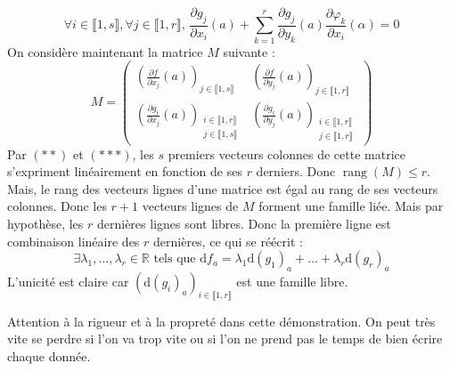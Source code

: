 \begin{demonstration}
		\[ \forall i \in \llbracket 1, s \rrbracket, \forall j \in \llbracket 1, r \rrbracket, \, \frac{\partial g_j}{\partial x_i}(a) + \sum_{k=1}^r \frac{\partial g_j}{\partial y_k}(a) \frac{\partial \varphi_k}{\partial x_i}(\alpha) = 0 \tag{$***$} \]
		On considère maintenant la matrice $M$ suivante :
		\[ M = \begin{pmatrix}
			\left( \frac{\partial f}{\partial x_j}(a) \right)_{j \in \llbracket 1, s \rrbracket} & \left( \frac{\partial f}{\partial y_j}(a) \right)_{j \in \llbracket 1, r \rrbracket} \\
			\left( \frac{\partial g_i}{\partial x_j}(a) \right)_{\substack{i \in \llbracket 1, r \rrbracket \\ j \in \llbracket 1, s \rrbracket}} & \left( \frac{\partial g_i}{\partial y_j}(a) \right)_{\substack{i \in \llbracket 1, r \rrbracket \\ j \in \llbracket 1, r \rrbracket}}
		\end{pmatrix} \]
		Par $(**)$ et $(***)$, les $s$ premiers vecteurs colonnes de cette matrice s'expriment linéairement en fonction de ses $r$ derniers. Donc $\operatorname{rang}(M) \leq r$. Mais, le rang des vecteurs lignes d'une matrice est égal au rang de ses vecteurs colonnes. Donc les $r+1$ vecteurs lignes de $M$ forment une famille liée. Mais par hypothèse, les $r$ dernières lignes sont libres. Donc la première ligne est combinaison linéaire des $r$ dernières, ce qui se réécrit :
		\[ \exists \lambda_1, \dots, \lambda_r \in \mathbb{R} \text{ tels que } \mathrm{d}f_a = \lambda_1 \mathrm{d}(g_1)_a + \dots + \lambda_r \mathrm{d}(g_r)_a \]
		L'unicité est claire car $(\mathrm{d}(g_i)_a)_{i \in \llbracket 1, r \rrbracket}$ est une famille libre.
	\end{demonstration}

	\begin{remark}
		Attention à la rigueur et à la propreté dans cette démonstration. On peut très vite se perdre si l'on va trop vite ou si l'on ne prend pas le temps de bien écrire chaque donnée.
	\end{remark}


